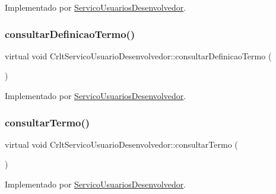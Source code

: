 Implementado por \mbox{\hyperlink{class_servico_usuarios_desenvolvedor_a552cca1c14e7c9dd87600062d524ffa8}{Servico\+Usuarios\+Desenvolvedor}}.

\mbox{\label{class_crlt_servico_usuario_desenvolvedor_acde5327b99fb4357276c4b0ab83fa20b}} 
\subsubsection{\texorpdfstring{consultar\+Definicao\+Termo()}{consultarDefinicaoTermo()}}
{\footnotesize\ttfamily virtual void Crlt\+Servico\+Usuario\+Desenvolvedor\+::consultar\+Definicao\+Termo (\begin{DoxyParamCaption}{ }\end{DoxyParamCaption})\hspace{0.3cm}{\ttfamily [pure virtual]}}



Implementado por \mbox{\hyperlink{class_servico_usuarios_desenvolvedor_aa125405f5b747e4e7bbacebd28934e72}{Servico\+Usuarios\+Desenvolvedor}}.

\mbox{\label{class_crlt_servico_usuario_desenvolvedor_a328f8ac2978c844ed4331d61ebfce32a}} 
\subsubsection{\texorpdfstring{consultar\+Termo()}{consultarTermo()}}
{\footnotesize\ttfamily virtual void Crlt\+Servico\+Usuario\+Desenvolvedor\+::consultar\+Termo (\begin{DoxyParamCaption}{ }\end{DoxyParamCaption})\hspace{0.3cm}{\ttfamily [pure virtual]}}



Implementado por \mbox{\hyperlink{class_servico_usuarios_desenvolvedor_a9c4a519147798c77d3fb6406f8078b9f}{Servico\+Usuarios\+Desenvolvedor}}.

